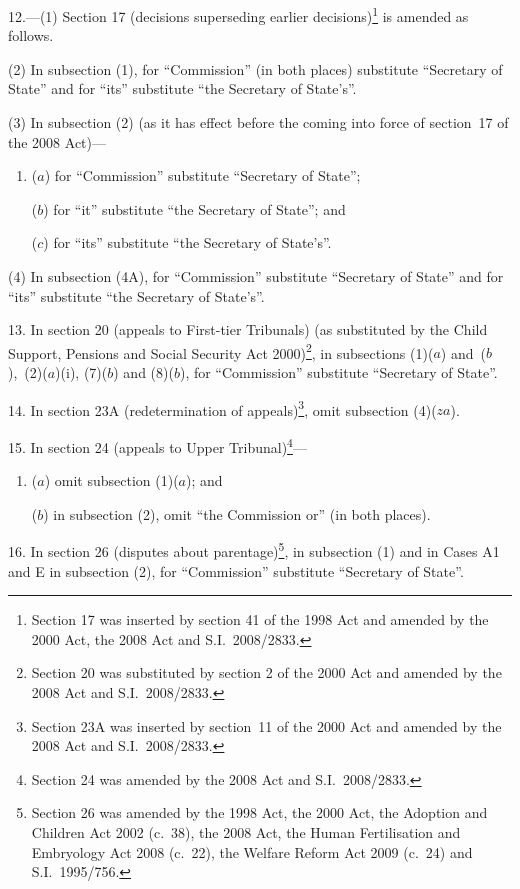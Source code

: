 \documentclass[12pt,a4paper]{article}
\begin{document}
\medskip

12.---(1)  Section 17 (decisions superseding earlier decisions)\footnote{Section 17 was inserted by section 41 of the 1998 Act and amended by the 2000 Act, the 2008 Act and S.I.~2008/2833.} is amended as follows.

(2) In subsection (1), for “Commission” (in both places) substitute “Secretary of State” and for “its” substitute “the Secretary of State’s”.

(3) In subsection (2) (as it has effect before the coming into force of section~17 of the 2008 Act)—
\begin{enumerate}\item[]
($a$) for “Commission” substitute “Secretary of State”;

($b$) for “it” substitute “the Secretary of State”; and

($c$) for “its” substitute “the Secretary of State’s”.
\end{enumerate}

(4) In subsection (4A), for “Commission” substitute “Secretary of State” and for “its” substitute “the Secretary of State’s”.

\medskip

13.  In section 20 (appeals to First-tier Tribunals) (as substituted by the Child Support, Pensions and Social Security Act 2000)\footnote{Section 20 was substituted by section 2 of the 2000 Act and amended by the 2008 Act and S.I.~2008/2833.}, in subsections (1)($a$)  and~($b$),~(2)($a$)(i), (7)($b$)  and (8)($b$), for “Commission” substitute “Secretary of State”.

\medskip

14.  In section 23A (redetermination of appeals)\footnote{Section 23A was inserted by section~11 of the 2000 Act and amended by the 2008 Act and S.I.~2008/2833.}, omit subsection (4)($za$).

\medskip

15.  In section 24 (appeals to Upper Tribunal)\footnote{Section 24 was amended by the 2008 Act and S.I.~2008/2833.}—
\begin{enumerate}\item[]
($a$) omit subsection (1)($a$); and

($b$) in subsection (2), omit “the Commission or” (in both places).
\end{enumerate}

\medskip

16.  In section 26 (disputes about parentage)\footnote{Section 26 was amended by the 1998 Act, the 2000 Act, the Adoption and Children Act 2002 (c.~38), the 2008 Act, the Human Fertilisation and Embryology Act 2008 (c.~22), the Welfare Reform Act 2009 (c.~24) and S.I.~1995/756.}, in subsection (1) and in Cases A1 and E in subsection (2), for “Commission” substitute “Secretary of State”.
\end{document}

